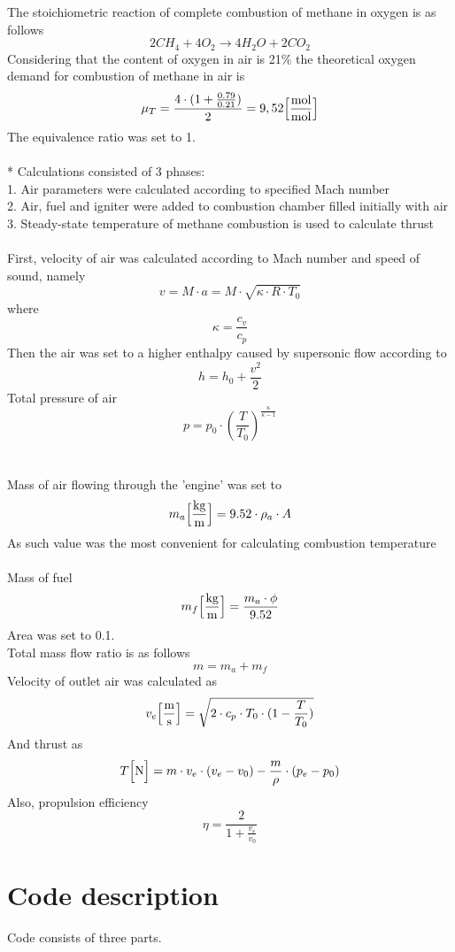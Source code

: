 \documentclass[a4paper, 12pt]{article}
\begin{document}
The stoichiometric reaction of complete combustion of methane in oxygen is as follows
\[ 2CH_4 + 4O_2 \rightarrow 4H_2 O+2CO_2 \]
Considering that the content of oxygen in air is 21\% the theoretical oxygen demand for combustion of methane in air is
\[\mu_T = \frac{4\cdot (1 + \frac{0.79}{0.21})}{2}=9,52 \Big[ \si[per-mode = fraction]{\mole\per\mole} \Big] \]
The equivalence ratio was set to 1.\\\\*
\noindent
Calculations consisted of 3 phases:\\
1. Air parameters were calculated according to specified Mach number \\
2. Air, fuel and igniter were added to combustion chamber filled initially with air \\
3. Steady-state temperature of methane combustion is used to calculate thrust\\\\
First, velocity of air was calculated according to Mach number and speed of sound, namely
\[v=M \cdot a = M \cdot \sqrt{\kappa \cdot R \cdot T_0}\]
where
\[\kappa = \frac{c_v}{c_p}\]
Then the air was set to a higher enthalpy caused by supersonic flow according to
\[h=h_0 + \frac{v^2}{2}\]
Total pressure of air
\[p=p_0 \cdot (\frac{T}{T_0})^\frac{\kappa}{\kappa-1}\]
\\\\
Mass of air flowing through the 'engine' was set to 
\[m_a \Big [ \si[per-mode = fraction]{\kilogram\per\m} \Big] =9.52 \cdot \rho_a\cdot A \]
As such value was the most convenient for calculating combustion temperature\\\\
Mass of fuel
\[m_f \Big [ \si[per-mode = fraction]{\kilogram\per\m} \Big] = \frac{m_a \cdot \phi}{9.52} \]
Area was set to 0.1.\\
Total mass flow ratio is as follows
\[m = m_a + m_f\]
Velocity of outlet air was calculated as
\[v_e \Big [ \si[per-mode = fraction]{\m\per\second} \Big] = \sqrt{2 \cdot c_p \cdot T_0 \cdot (1-\frac{T}{T_0})}\]
And thrust as
\[T \Big [ \si[per-mode = fraction]{\newton} \Big] = m \cdot v_e \cdot (v_e-v_0) - \frac{m}{\rho}\cdot (p_e-p_0)\]
Also, propulsion efficiency
\[\eta = \frac{2}{1+\frac{v_e}{v_0}}\]


\section{Code description}
Code consists of three parts.\\
\end{document}
